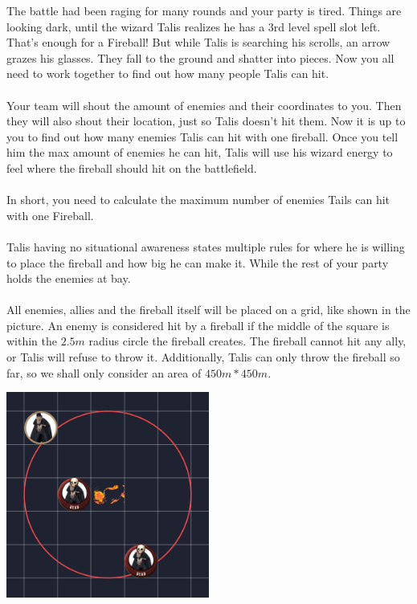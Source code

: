 
The battle had been raging for many rounds and your party is tired. Things are looking dark, until the wizard Talis realizes he has a 3rd level spell slot left.
That's enough for a Fireball! But while Talis is searching his scrolls, an arrow grazes his glasses. They fall to the ground and shatter into pieces. Now you all need to work together to find out how many people Talis can hit.
\\
\\
Your team will shout the amount of enemies and their coordinates to you. Then they will also shout their location, just so Talis doesn't hit them. Now it is up to you to find out how many enemies Talis can hit with one fireball. Once you tell him the max amount of enemies he can hit, Talis will use his wizard energy to feel where the fireball should hit on the battlefield.
\\
\\
In short, you need to calculate the maximum number of enemies Tails can hit with one Fireball.
\\
\\
Talis having no situational awareness states multiple rules for where he is willing to place the fireball and how big he can make it. While the rest of your party holds the enemies at bay.
\\
\\
All enemies, allies and the fireball itself will be placed on a grid, like shown in the picture. An enemy is considered hit by a fireball if the middle of the square is within the $2.5 m$ radius circle the fireball creates. The fireball cannot hit any ally, or Talis will refuse to throw it. Additionally, Talis can only throw the fireball so far, so we shall only consider an area of $450 m * 450 m$.

\begin{center}
  \includegraphics[width=0.5\textwidth]{Example.png}
\end{center}

